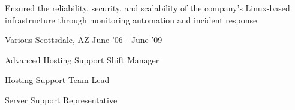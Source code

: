\begin{cventries}
{\begin{cvitems}
		  \item Ensured the reliability, security, and scalability of the company's Linux-based infrastructure through monitoring automation and incident response
        \end{cvitems}
    }
\vspace{0mm}
\cventry
    {Various} %
    {} %
    {Scottsdale, AZ} %
    {June '06 - June '09} %
    {
        \begin{cvitems}
		  \item Advanced Hosting Support Shift Manager
		  \item Hosting Support Team Lead 
		  \item Server Support Representative 
        \end{cvitems}
    }
\end{cventries}

